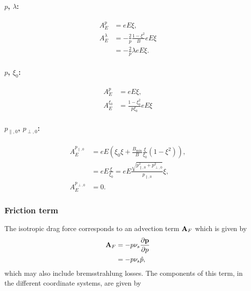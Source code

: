 \documentclass[11pt,a4paper]{article}
\newcommand{\sub}[1]{\ensuremath{_{\text{#1}}}}
\renewcommand{\b}[1]{\ensuremath{ {\bf #1 } }}
\begin{document}
\paragraph{$p$, $\lambda$:}
\begin{align}
A_E^p &= eE \xi, \nonumber \\
A_E^\lambda &= - \frac{2}{p}\frac{1-\xi^2}{B} eE\xi \nonumber \\
&= -\frac{2}{p}\lambda eE\xi. 
\end{align}

\paragraph{$p$, $\xi_0$:}
\begin{align}
A_E^p &= eE \xi, \nonumber \\
A_E^{\xi_0} &=  \frac{1-\xi_0^2}{p\xi_0} eE\xi 
\end{align}

\paragraph{$p_{\parallel,0}$, $p_{\perp,0}$:}
\begin{align}
A_E^{p_{\parallel,0}} &= eE\left( \xi_0\xi + \frac{B\sub{min}}{B}\frac{\xi}{\xi_0} (1-\xi^2) \right), \nonumber \\
&=eE \frac{\xi}{\xi_0} = eE \frac{\sqrt{p_{\parallel,0}^2+p_{\perp,0}^2}}{p_{\parallel,0}}\xi,\nonumber \\%
A_E^{p_{\perp,0}} &= 0. %
\end{align}



\subsubsection*{Friction term}
The isotropic drag force corresponds to an advection term $\b{A}_F$ which is given by
\begin{align}
\b{A}_F &= -p\nu_s\frac{\partial \b{p}}{\partial p} \nonumber \\
&= -p\nu_s \hat{p},
\end{align}
which may also include bremsstrahlung losses. The components of this term, in the different coordinate systems, are given by
\end{document}
